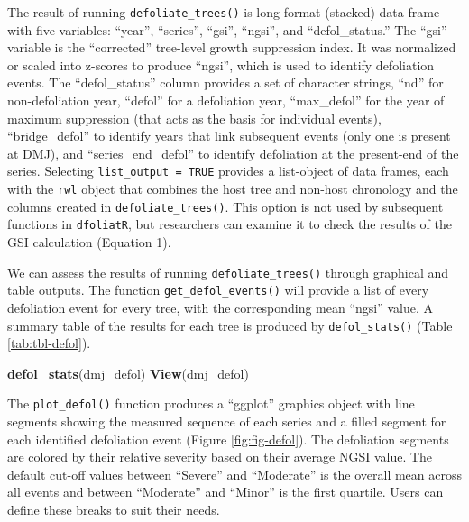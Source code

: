 \documentclass[review]{elsarticle} %
\newenvironment{Shaded}{\begin{snugshade}}{\end{snugshade}}
\newcommand{\KeywordTok}[1]{\textcolor[rgb]{0.13,0.29,0.53}{\textbf{#1}}}
\newcommand{\NormalTok}[1]{#1}
\begin{document}
The result of running \texttt{defoliate\_trees()} is long-format (stacked) data frame with five variables: ``year'', ``series'', ``gsi'', ``ngsi'', and ``defol\_status.'' The ``gsi'' variable is the ``corrected'' tree-level growth suppression index. It was normalized or scaled into z-scores to produce ``ngsi'', which is used to identify defoliation events. The ``defol\_status'' column provides a set of character strings, ``nd'' for non-defoliation year, ``defol'' for a defoliation year, ``max\_defol'' for the year of maximum suppression (that acts as the basis for individual events), ``bridge\_defol'' to identify years that link subsequent events (only one is present at DMJ), and ``series\_end\_defol'' to identify defoliation at the present-end of the series. Selecting \texttt{list\_output\ =\ TRUE} provides a list-object of data frames, each with the \texttt{rwl} object that combines the host tree and non-host chronology and the columns created in \texttt{defoliate\_trees()}. This option is not used by subsequent functions in \texttt{dfoliatR}, but researchers can examine it to check the results of the GSI calculation (Equation 1).

We can assess the results of running \texttt{defoliate\_trees()} through graphical and table outputs. The function \texttt{get\_defol\_events()} will provide a list of every defoliation event for every tree, with the corresponding mean ``ngsi'' value. A summary table of the results for each tree is produced by \texttt{defol\_stats()} (Table \ref{tab:tbl-defol}).

\begin{Shaded}
\begin{Highlighting}[]
\KeywordTok{defol_stats}\NormalTok{(dmj_defol)}
\KeywordTok{View}\NormalTok{(dmj_defol)}
\end{Highlighting}
\end{Shaded}

The \texttt{plot\_defol()} function produces a ``ggplot'' graphics object with line segments showing the measured sequence of each series and a filled segment for each identified defoliation event (Figure \ref{fig:fig-defol}). The defoliation segments are colored by their relative severity based on their average NGSI value. The default cut-off values between ``Severe'' and ``Moderate'' is the overall mean across all events and between ``Moderate'' and ``Minor'' is the first quartile. Users can define these breaks to suit their needs.
\end{document}
